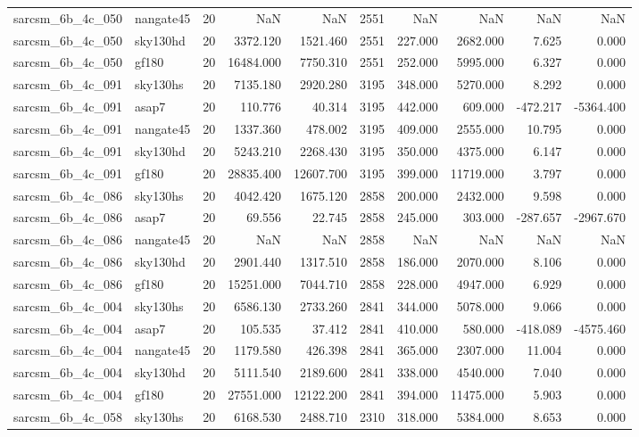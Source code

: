 \begin{tabular}{llrrrrrrrr}
sarcsm\_6b\_4c\_050 & nangate45 & 20 & NaN & NaN & 2551 & NaN & NaN & NaN & NaN \\
sarcsm\_6b\_4c\_050 & sky130hd & 20 & 3372.120 & 1521.460 & 2551 & 227.000 & 2682.000 & 7.625 & 0.000 \\
sarcsm\_6b\_4c\_050 & gf180 & 20 & 16484.000 & 7750.310 & 2551 & 252.000 & 5995.000 & 6.327 & 0.000 \\
sarcsm\_6b\_4c\_091 & sky130hs & 20 & 7135.180 & 2920.280 & 3195 & 348.000 & 5270.000 & 8.292 & 0.000 \\
sarcsm\_6b\_4c\_091 & asap7 & 20 & 110.776 & 40.314 & 3195 & 442.000 & 609.000 & -472.217 & -5364.400 \\
sarcsm\_6b\_4c\_091 & nangate45 & 20 & 1337.360 & 478.002 & 3195 & 409.000 & 2555.000 & 10.795 & 0.000 \\
sarcsm\_6b\_4c\_091 & sky130hd & 20 & 5243.210 & 2268.430 & 3195 & 350.000 & 4375.000 & 6.147 & 0.000 \\
sarcsm\_6b\_4c\_091 & gf180 & 20 & 28835.400 & 12607.700 & 3195 & 399.000 & 11719.000 & 3.797 & 0.000 \\
sarcsm\_6b\_4c\_086 & sky130hs & 20 & 4042.420 & 1675.120 & 2858 & 200.000 & 2432.000 & 9.598 & 0.000 \\
sarcsm\_6b\_4c\_086 & asap7 & 20 & 69.556 & 22.745 & 2858 & 245.000 & 303.000 & -287.657 & -2967.670 \\
sarcsm\_6b\_4c\_086 & nangate45 & 20 & NaN & NaN & 2858 & NaN & NaN & NaN & NaN \\
sarcsm\_6b\_4c\_086 & sky130hd & 20 & 2901.440 & 1317.510 & 2858 & 186.000 & 2070.000 & 8.106 & 0.000 \\
sarcsm\_6b\_4c\_086 & gf180 & 20 & 15251.000 & 7044.710 & 2858 & 228.000 & 4947.000 & 6.929 & 0.000 \\
sarcsm\_6b\_4c\_004 & sky130hs & 20 & 6586.130 & 2733.260 & 2841 & 344.000 & 5078.000 & 9.066 & 0.000 \\
sarcsm\_6b\_4c\_004 & asap7 & 20 & 105.535 & 37.412 & 2841 & 410.000 & 580.000 & -418.089 & -4575.460 \\
sarcsm\_6b\_4c\_004 & nangate45 & 20 & 1179.580 & 426.398 & 2841 & 365.000 & 2307.000 & 11.004 & 0.000 \\
sarcsm\_6b\_4c\_004 & sky130hd & 20 & 5111.540 & 2189.600 & 2841 & 338.000 & 4540.000 & 7.040 & 0.000 \\
sarcsm\_6b\_4c\_004 & gf180 & 20 & 27551.000 & 12122.200 & 2841 & 394.000 & 11475.000 & 5.903 & 0.000 \\
sarcsm\_6b\_4c\_058 & sky130hs & 20 & 6168.530 & 2488.710 & 2310 & 318.000 & 5384.000 & 8.653 & 0.000 \\

\end{tabular}
